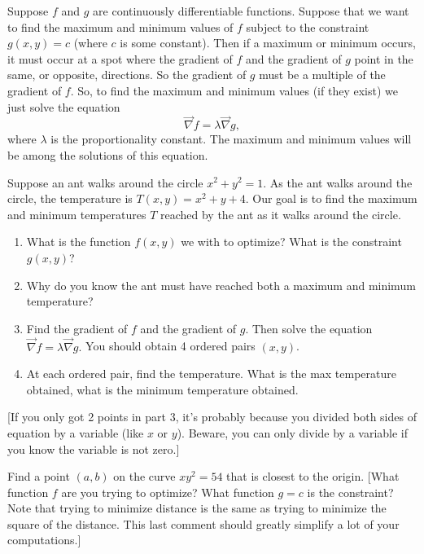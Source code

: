 \begin{theorem}
Suppose $f$ and $g$ are continuously differentiable functions. Suppose that we want to find the maximum and minimum values of $f$ subject to the constraint $g(x,y)=c$ (where $c$ is some constant).  Then if a maximum or minimum occurs, it must occur at a spot where the gradient of $f$ and the gradient of $g$ point in the same, or opposite, directions. So the gradient of $g$ must be a multiple of the gradient of $f$. So, to find the maximum and minimum values (if they exist) we just solve the equation 
$$\vec \nabla f = \lambda \vec \nabla g,$$ where $\lambda$ is the proportionality constant. The maximum and minimum values will be among the solutions of this equation. 
\end{theorem}

\begin{problem}
 Suppose an ant walks around the circle $x^2+y^2=1$.  As the ant walks around the circle, the temperature is $T(x,y) = x^2+y+4$.  Our goal is to find the maximum and minimum temperatures $T$ reached by the ant as it walks around the circle. 
 \begin{enumerate}
  \item What is the function $f(x,y)$ we with to optimize? What is the constraint $g(x,y)$?
  \item Why do you know the ant must have reached both a maximum and minimum temperature?
  \item Find the gradient of $f$ and the gradient of $g$.  Then solve the equation $\vec \nabla f = \lambda \vec \nabla g.$ You should obtain 4 ordered pairs $(x,y)$.
  \item At each ordered pair, find the temperature.  What is the max temperature obtained, what is the minimum temperature obtained.
 \end{enumerate}
[If you only got 2 points in part 3, it's probably because you divided both sides of equation by a variable (like $x$ or $y$).  Beware, you can only divide by a variable if you know the variable is not zero.]
\end{problem}

\begin{problem}
 Find a point $(a,b)$ on the curve $xy^2=54$ that is closest to the origin.  [What function $f$ are you trying to optimize? What function $g=c$ is the constraint? Note that trying to minimize distance is the same as trying to minimize the square of the distance. This last comment should greatly simplify a lot of your computations.]
\end{problem}

